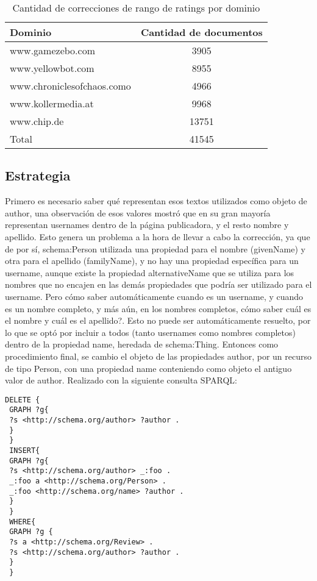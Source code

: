 \begin{table}[h]
\begin{tabular}{| l | c |}\hline
 Dominio & Cantidad de documentos \\\hline
 www.gamezebo.com & 3905\\
 www.yellowbot.com & 8955\\
 www.chroniclesofchaos.como & 4966\\
 www.kollermedia.at & 9968\\
 www.chip.de & 13751\\\hline
 Total & 41545\\\hline
\end{tabular}
\caption{Cantidad de correcciones de rango de ratings por dominio}
\label{table:DomainRangeCorrections}
\end{table}

\subsection*{Estrategia}
Primero es necesario saber qué representan esos textos utilizados como objeto de author, una observación de esos valores mostró que 
en su gran mayoría representan usernames dentro de la página publicadora, y el resto nombre y apellido.
Esto genera un problema a la hora de llevar a cabo la corrección, ya que de por sí, schema:Person utilizada una propiedad para el nombre (givenName) 
y otra para el apellido (familyName), y no hay una propiedad específica para un username, aunque existe la propiedad alternativeName que 
se utiliza para los nombres que no encajen en las demás propiedades que podría ser utilizado para el username.
Pero cómo saber automáticamente cuando es un username, y cuando es un nombre completo, y más aún, en los nombres completos, cómo saber cuál es el nombre y 
cuál es el apellido?.
Esto no puede ser automáticamente resuelto, por lo que se optó por incluir a todos (tanto usernames como nombres completos) dentro de la propiedad name, heredada de 
schema:Thing.
Entonces como procedimiento final, se cambio el objeto de las propiedades author, por un recurso de tipo Person, con una propiedad name conteniendo 
como objeto el antiguo valor de author. Realizado con la siguiente consulta SPARQL:\\
\begin{lstlisting}[frame=single]
 DELETE { 
 GRAPH ?g{ 
 ?s <http://schema.org/author> ?author .
 } 
 } 
 INSERT{ 
 GRAPH ?g{ 
 ?s <http://schema.org/author> _:foo .
 _:foo a <http://schema.org/Person> .
 _:foo <http://schema.org/name> ?author .
 }
 }
 WHERE{
 GRAPH ?g {
 ?s a <http://schema.org/Review> .
 ?s <http://schema.org/author> ?author .
 }
 }
\end{lstlisting}